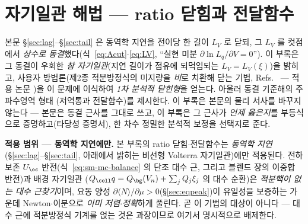 \setcounter{section}{4}
\section{자기일관 해법 --- ratio 닫힘과 전달함수}\label{sec:appendix-selfconsistent}
본문 \S\ref{sec:lag}--\S\ref{sec:tail} 은 동역학 지연을 전이당 한 길이 $L_V$ 로 닫되, 그 $L_V$ 를 컷점에서
\emph{상수로 동결}했다(식~\eqref{eq:Acut}$\cdot$\eqref{eq:LV}, ``실현 미분 $\partial\ln L_q/\partial V=0$''). 이 부록은
그 동결이 우회한 \emph{참 자기일관}(지연 길이가 점유에 되먹임되는 $L_V=L_V(\xi)$)을 밝히고, 사용자 방법론(제2종
적분방정식의 미지량을 \emph{비}로 치환해 닫는 기법, Refs.~\cite{lee2011jcp,son2013jcp} --- 적용 논문
\cite{lee2017jcp})을 이 문제에 이식하여 \emph{1차 분석적 닫힌형}을 얻는다. 아울러 동결 기준해의 주파수영역 형태
(저역통과 전달함수)를 제시한다. 이 부록은 본문의 물리 서사를 바꾸지 않는다 --- 본문은 동결 근사를 그대로 쓰고,
이 부록은 그 근사가 \emph{언제 옳은지}를 부등식으로 증명하고(타당성 증명서), 한 차수 정밀한 분석적 보정을 선택지로 준다.

\begin{warnbox}
\textbf{적용 범위 --- 동역학 지연에만.} 본 부록의 ratio 닫힘$\cdot$전달함수는 \emph{동역학 지연}
(\S\ref{sec:lag}--\S\ref{sec:tail}, 아래에서 밝히는 비선형 Volterra 자기일관)에만 적용된다. 전하 보존
$U_\oc$ 반전(식~\eqref{eq:sm-mc-balance} 의 단조 대수 근, 그리고 블렌드 장의 이중합 반전)과 배경 자기일관
($Q_\cell q=Q_\bg(V_n)+\sum_jQ_j\xi_j$ 의 대수 순환)은 \emph{적분핵이 없는 대수 근찾기}이며, 요동 양성
$\partial\langle N\rangle/\partial\mu>0$(\S\ref{sec:eqpeak})이 유일성을 보증하는 가운데 Newton$\cdot$이분으로
\emph{이미 저렴$\cdot$정확}하게 풀린다. 곧 이 기법의 대상이 아니다 --- 대수 근에 적분방정식 기계를 얹는 것은
과장이므로 여기서 명시적으로 배제한다.
\end{warnbox}

